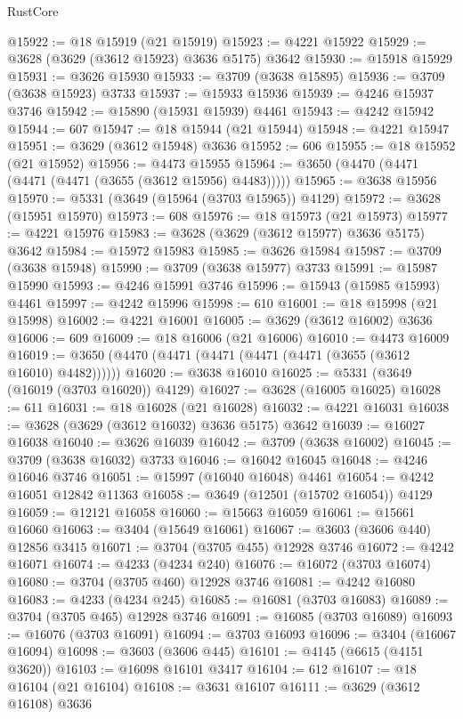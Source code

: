\begin{lexlean}{RustCore}
\begin{coremodule}
@15922 := @18 @15919 (@21 @15919)
@15923 := @4221 @15922
@15929 := @3628 (@3629 (@3612 @15923) @3636 @5175) @3642
@15930 := @15918 @15929
@15931 := @3626 @15930
@15933 := @3709 (@3638 @15895)
@15936 := @3709 (@3638 @15923) @3733
@15937 := @15933 @15936
@15939 := @4246 @15937 @3746
@15942 := @15890 (@15931 @15939) @4461
@15943 := @4242 @15942
@15944 := 607
@15947 := @18 @15944 (@21 @15944)
@15948 := @4221 @15947
@15951 := @3629 (@3612 @15948) @3636
@15952 := 606
@15955 := @18 @15952 (@21 @15952)
@15956 := @4473 @15955
@15964 := @3650 (@4470 (@4471 (@4471 (@4471 (@3655 (@3612 @15956) @4483)))))
@15965 := @3638 @15956
@15970 := @5331 (@3649 (@15964 (@3703 @15965)) @4129)
@15972 := @3628 (@15951 @15970)
@15973 := 608
@15976 := @18 @15973 (@21 @15973)
@15977 := @4221 @15976
@15983 := @3628 (@3629 (@3612 @15977) @3636 @5175) @3642
@15984 := @15972 @15983
@15985 := @3626 @15984
@15987 := @3709 (@3638 @15948)
@15990 := @3709 (@3638 @15977) @3733
@15991 := @15987 @15990
@15993 := @4246 @15991 @3746
@15996 := @15943 (@15985 @15993) @4461
@15997 := @4242 @15996
@15998 := 610
@16001 := @18 @15998 (@21 @15998)
@16002 := @4221 @16001
@16005 := @3629 (@3612 @16002) @3636
@16006 := 609
@16009 := @18 @16006 (@21 @16006)
@16010 := @4473 @16009
@16019 := @3650 (@4470 (@4471 (@4471 (@4471 (@4471 (@3655 (@3612 @16010) @4482))))))
@16020 := @3638 @16010
@16025 := @5331 (@3649 (@16019 (@3703 @16020)) @4129)
@16027 := @3628 (@16005 @16025)
@16028 := 611
@16031 := @18 @16028 (@21 @16028)
@16032 := @4221 @16031
@16038 := @3628 (@3629 (@3612 @16032) @3636 @5175) @3642
@16039 := @16027 @16038
@16040 := @3626 @16039
@16042 := @3709 (@3638 @16002)
@16045 := @3709 (@3638 @16032) @3733
@16046 := @16042 @16045
@16048 := @4246 @16046 @3746
@16051 := @15997 (@16040 @16048) @4461
@16054 := @4242 @16051 @12842 @11363
@16058 := @3649 (@12501 (@15702 @16054)) @4129
@16059 := @12121 @16058
@16060 := @15663 @16059
@16061 := @15661 @16060
@16063 := @3404 (@15649 @16061)
@16067 := @3603 (@3606 @440) @12856 @3415
@16071 := @3704 (@3705 @455) @12928 @3746
@16072 := @4242 @16071
@16074 := @4233 (@4234 @240)
@16076 := @16072 (@3703 @16074)
@16080 := @3704 (@3705 @460) @12928 @3746
@16081 := @4242 @16080
@16083 := @4233 (@4234 @245)
@16085 := @16081 (@3703 @16083)
@16089 := @3704 (@3705 @465) @12928 @3746
@16091 := @16085 (@3703 @16089)
@16093 := @16076 (@3703 @16091)
@16094 := @3703 @16093
@16096 := @3404 (@16067 @16094)
@16098 := @3603 (@3606 @445)
@16101 := @4145 (@6615 (@4151 @3620))
@16103 := @16098 @16101 @3417
@16104 := 612
@16107 := @18 @16104 (@21 @16104)
@16108 := @3631 @16107
@16111 := @3629 (@3612 @16108) @3636

\end{coremodule}
\end{lexlean}
